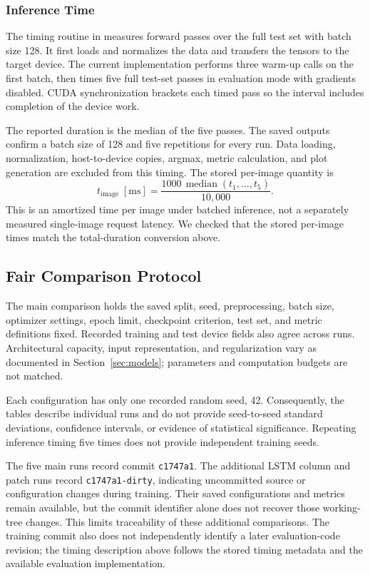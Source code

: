 \subsubsection{Inference Time}

The timing routine in  measures forward passes over the full test set with batch size 128. It first loads and normalizes the data and transfers the tensors to the target device. The current implementation performs three warm-up calls on the first batch, then times five full test-set passes in evaluation mode with gradients disabled. CUDA synchronization brackets each timed pass so the interval includes completion of the device work.

The reported duration is the median of the five passes. The saved outputs confirm a batch size of 128 and five repetitions for every run. Data loading, normalization, host-to-device copies, argmax, metric calculation, and plot generation are excluded from this timing. The stored per-image quantity is
\begin{equation}
    t_{\mathrm{image}}\;[\mathrm{ms}]
    =\frac{1000\,\operatorname{median}(t_1,\ldots,t_5)}{10{,}000}.
\end{equation}
This is an amortized time per image under batched inference, not a separately measured single-image request latency. We checked that the stored per-image times match the total-duration conversion above.

\subsection{Fair Comparison Protocol}

The main comparison holds the saved split, seed, preprocessing, batch size, optimizer settings, epoch limit, checkpoint criterion, test set, and metric definitions fixed. Recorded training and test device fields also agree across runs. Architectural capacity, input representation, and regularization vary as documented in Section~\ref{sec:models}; parameters and computation budgets are not matched.

Each configuration has only one recorded random seed, 42. Consequently, the tables describe individual runs and do not provide seed-to-seed standard deviations, confidence intervals, or evidence of statistical significance. Repeating inference timing five times does not provide independent training seeds.

The five main runs record commit \texttt{c1747a1}. The additional LSTM column and patch runs record \texttt{c1747a1-dirty}, indicating uncommitted source or configuration changes during training. Their saved configurations and metrics remain available, but the commit identifier alone does not recover those working-tree changes. This limits traceability of these additional comparisons. The training commit also does not independently identify a later evaluation-code revision; the timing description above follows the stored timing metadata and the available evaluation implementation.

